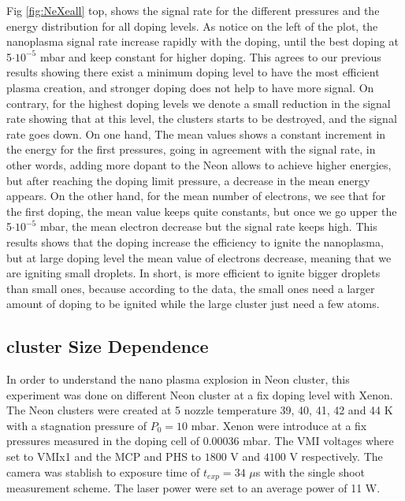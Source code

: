 Fig \ref{fig:NeXeall} top, shows the signal rate for the different pressures and the energy distribution for all doping levels. As notice on the left of the plot, the nanoplasma signal rate increase rapidly with the doping, until the best doping at 5$\cdot10^{-5}$ mbar and keep constant for higher doping. This agrees to our previous results showing there exist a minimum doping level to have the most efficient plasma creation, and stronger doping does not help to have more signal. On contrary, for the highest doping levels we denote a small reduction in the signal rate showing that at this level, the clusters starts to be destroyed, and the signal rate goes down.
On one hand,  The mean values shows a constant increment in the energy for the first pressures, going in agreement with the signal rate, in other words, adding more dopant to the  Neon allows to achieve higher energies, but after reaching the doping limit pressure, a decrease in the mean energy appears. On the other hand, for the mean number of electrons, we see that for the first doping, the mean value keeps quite constants, but once we go upper the 5$\cdot10^{-5}$ mbar, the mean electron decrease but the signal rate keeps high. This results shows that the doping increase the efficiency to ignite the nanoplasma, but at large doping level the mean value of electrons decrease, meaning that we are igniting small droplets. In short, is more efficient to ignite bigger droplets than small ones, because according to the data, the small ones need a larger amount of doping to be ignited while the large cluster just need a few atoms.

%

\subsection{cluster Size Dependence}

In order to understand the nano plasma explosion in Neon cluster, this experiment was done on different Neon cluster at a fix doping level with Xenon. The Neon clusters were created at 5 nozzle temperature 39, 40, 41, 42 and 44 K with a stagnation pressure of $P_{0}=10$ mbar. Xenon were introduce at a fix  pressures measured in the doping cell of 0.00036 mbar. The VMI voltages  where set to VMIx1  and the MCP and PHS to $1800$ V and $4100$ V respectively. The camera was stablish to exposure time of $t_{exp}=34$ $\mu$s   with the single shoot measurement scheme. The laser power were set to an average power of 11 W.

